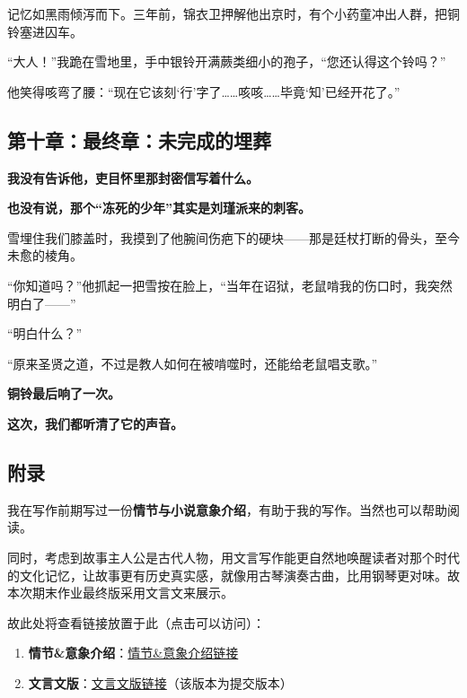 \documentclass{article}
\begin{document}
	记忆如黑雨倾泻而下。三年前，锦衣卫押解他出京时，有个小药童冲出人群，把铜铃塞进囚车。  
	
	“大人！”我跪在雪地里，手中银铃开满蕨类细小的孢子，“您还认得这个铃吗？”  
	
	他笑得咳弯了腰：“现在它该刻‘行’字了……咳咳……毕竟‘知’已经开花了。” 
	
	\subsection{第十章：最终章：未完成的埋葬}
	
	\textbf{我没有告诉他，吏目怀里那封密信写着什么。}  
	
	\textbf{也没有说，那个“冻死的少年”其实是刘瑾派来的刺客。}  
	
	雪埋住我们膝盖时，我摸到了他腕间伤疤下的硬块——那是廷杖打断的骨头，至今未愈的棱角。  
	
	“你知道吗？”他抓起一把雪按在脸上，“当年在诏狱，老鼠啃我的伤口时，我突然明白了——”  
	
	“明白什么？”  
	
	“原来圣贤之道，不过是教人如何在被啃噬时，还能给老鼠唱支歌。”  
	
	\textbf{铜铃最后响了一次。 } 
	
	\textbf{这次，我们都听清了它的声音。}
	
	\clearpage
	
	\subsection{附录}
	
	我在写作前期写过一份\textbf{情节与小说意象介绍}，有助于我的写作。当然也可以帮助阅读。
	
	同时，考虑到故事主人公是古代人物，用文言写作能更自然地唤醒读者对那个时代的文化记忆，让故事更有历史真实感，就像用古琴演奏古曲，比用钢琴更对味。故本次期末作业最终版采用文言文来展示。
	
	故此处将查看链接放置于此（点击可以访问）：
	
	\begin{enumerate}[noitemsep, label={{\arabic*})}]
		\item \textbf{情节\&意象介绍}：\href{https://github.com/SoftGhostGU/In_class_related/blob/main/%E4%B8%AD%E5%9B%BD%E6%96%87%E5%8C%96%E9%80%9A%E8%AE%BA/%E6%83%85%E8%8A%82%E4%BB%8B%E7%BB%8D/%E6%95%85%E4%BA%8B%E6%83%85%E8%8A%82%E7%9B%B8%E5%85%B3.pdf}{情节\&意象介绍链接}
		\item \textbf{文言文版}：\href{https://github.com/SoftGhostGU/In_class_related/blob/main/%E4%B8%AD%E5%9B%BD%E6%96%87%E5%8C%96%E9%80%9A%E8%AE%BA/%E3%80%8A%E9%9B%AA%E4%B8%AD%E9%93%83%E3%80%8B/%E3%80%8A%E9%9B%AA%E4%B8%AD%E9%93%83%E3%80%8B.pdf}{文言文版链接}（该版本为提交版本）
	\end{enumerate}\textbf{}
	
\end{document}
